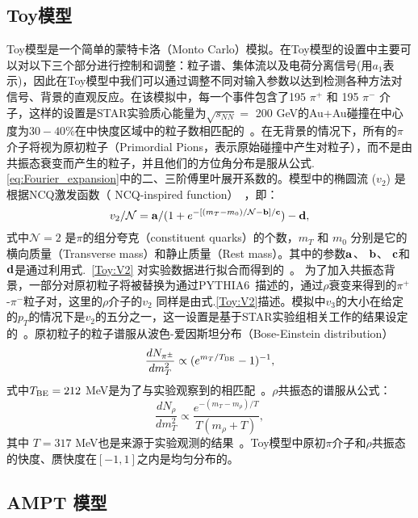 \subsection{Toy模型}

Toy模型是一个简单的蒙特卡洛（Monto Carlo）模拟。在Toy模型的设置中主要可以对以下三个部分进行控制和调整：粒子谱、集体流以及电荷分离信号(用$a_1$表示)，因此在Toy模型中我们可以通过调整不同对输入参数以达到检测各种方法对信号、背景的直观反应。在该模拟中，每一个事件包含了195 $\pi^+$ 和 195 $\pi^-$ 介子，这样的设置是STAR实验质心能量为$\sqrt{s_{NN}}=$ 200 GeV的Au+Au碰撞在中心度为$30-40\%$在中快度区域中的粒子数相匹配的~\cite{STAR-pion-spct}。在无背景的情况下，所有的$\pi$介子将视为原初粒子（Primordial Pions，表示原始碰撞中产生对粒子），而不是由共振态衰变而产生的粒子，并且他们的方位角分布是服从公式. \ref {eq:Fourier_expansion}中的二、三阶傅里叶展开系数的。模型中的椭圆流 ($v_2$) 是根据NCQ激发函数（ NCQ-inspired function）~\cite{NCQ-scalling,XU2004165}，即：
\begin{equation} \label{Toy:V2}
v_2/\mathcal{N} = {\bf a}/(1+e^{-[(m_T-m_0)/\mathcal{N} -{\bf b}]/{\bf c}}) - {\bf d}, 
\end{equation}
式中$\mathcal{N}=2$ 是$\pi$的组分夸克（constituent quarks）的个数，$m_T$ 和 $m_0$ 分别是它的横向质量（Transverse mass）和静止质量（Rest mass）。其中的参数${\bf a}$、 ${\bf b}$、 ${\bf c}$和${\bf d}$是通过利用式.~\ref{Toy:V2} 对实验数据进行拟合而得到的~\cite{Wang:2016iov}。
为了加入共振态背景，一部分对原初粒子将被替换为通过PYTHIA6~\cite{PYTHIA}描述的，通过$\rho$衰变来得到的$\pi^+$-$\pi^-$粒子对，这里的$\rho$介子的$v_2$ 同样是由式.\ref{Toy:V2}描述。模拟中$v_3$的大小在给定的$p_T$的情况下是$v_2$的五分之一，这一设置是基于STAR实验组相关工作的结果设定的~\cite{STAR-rho-spct}。原初粒子的粒子谱服从波色-爱因斯坦分布（Bose-Einstein distribution）
\begin{equation}
\frac{dN_{\pi^\pm}}{dm_T^2} \propto (e^{m_T/T_{\rm BE}}-1)^{-1},
\end{equation}
式中$T_{\rm BE} = 212$ MeV是为了与实验观察到的相匹配~\cite{STAR-pion-spct}。$\rho$共振态的谱服从公式：
\begin{equation}
\frac{dN_\rho}{dm_T^2} \propto \frac{e^{-(m_T-m_\rho)/T}}{T(m_\rho+T)},
\end{equation}
其中 $T = 317$ MeV也是来源于实验观测的结果~\cite{STAR-rho-spct}。Toy模型中原初$\pi$介子和$\rho$共振态的快度、赝快度在$ [-1, 1] $之内是均匀分布的。




\subsection{AMPT 模型}

